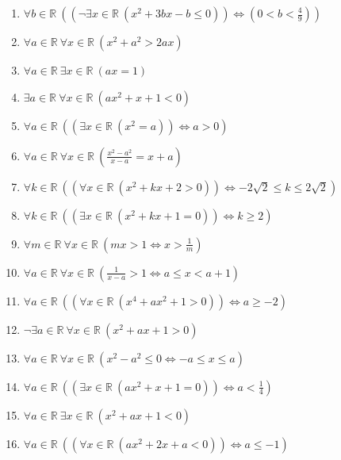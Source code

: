 \documentclass[11pt,a4paper]{article}
\begin{document}
\begin{enumerate}
\item $\displaystyle \forall b \in \mathbb{R}\ \left( \left(\lnot \exists x \in \mathbb{R}\ (x^{2} + 3bx - b \le 0)\right) \iff \left( 0 < b < \frac{4}{9} \right) \right)$
\item $\displaystyle \forall a \in \mathbb{R}\ \forall x \in \mathbb{R}\ (x^{2} + a^{2} > 2ax)$
\item $\displaystyle \forall a \in \mathbb{R}\ \exists x \in \mathbb{R}\ (ax = 1)$
\item $\displaystyle \exists a \in \mathbb{R}\ \forall x \in \mathbb{R}\ (ax^{2} + x + 1 < 0)$
\item $\displaystyle \forall a \in \mathbb{R}\ \left( \left(\exists x \in \mathbb{R}\ (x^{2} = a)\right) \iff a > 0 \right)$
\item $\displaystyle \forall a \in \mathbb{R}\ \forall x \in \mathbb{R}\ \left(\frac{x^{2} - a^{2}}{x - a} = x + a\right)$
\item $\displaystyle \forall k \in \mathbb{R}\ \left( \left(\forall x \in \mathbb{R}\ (x^{2} + kx + 2 > 0)\right) \iff -2\sqrt{2} \le k \le 2\sqrt{2} \right)$
\item $\displaystyle \forall k \in \mathbb{R}\ \left( \left(\exists x \in \mathbb{R}\ (x^{2} + kx + 1 = 0)\right) \iff k \ge 2 \right)$
\item $\displaystyle \forall m \in \mathbb{R}\ \forall x \in \mathbb{R}\ \left( mx > 1 \iff x > \frac{1}{m} \right)$
\item $\displaystyle \forall a \in \mathbb{R}\ \forall x \in \mathbb{R}\ \left( \frac{1}{x - a} > 1 \iff a \le x < a + 1 \right)$
\item $\displaystyle \forall a \in \mathbb{R}\ \left( \left(\forall x \in \mathbb{R}\ (x^{4} + ax^{2} + 1 > 0)\right) \iff a \ge -2 \right)$
\item $\displaystyle \lnot \exists a \in \mathbb{R}\ \forall x \in \mathbb{R}\ (x^{2} + ax + 1 > 0)$
\item $\displaystyle \forall a \in \mathbb{R}\ \forall x \in \mathbb{R}\ \left( x^{2} - a^{2} \le 0 \iff -a \le x \le a \right)$
\item $\displaystyle \forall a \in \mathbb{R}\ \left( \left(\exists x \in \mathbb{R}\ (ax^{2} + x + 1 = 0)\right) \iff a < \frac{1}{4} \right)$
\item $\displaystyle \forall a \in \mathbb{R}\ \exists x \in \mathbb{R}\ (x^{2} + ax + 1 < 0)$
\item $\displaystyle \forall a \in \mathbb{R}\ \left( \left(\forall x \in \mathbb{R}\ (ax^{2} + 2x + a < 0)\right) \iff a \le -1 \right)$

\end{enumerate}
\end{document}
